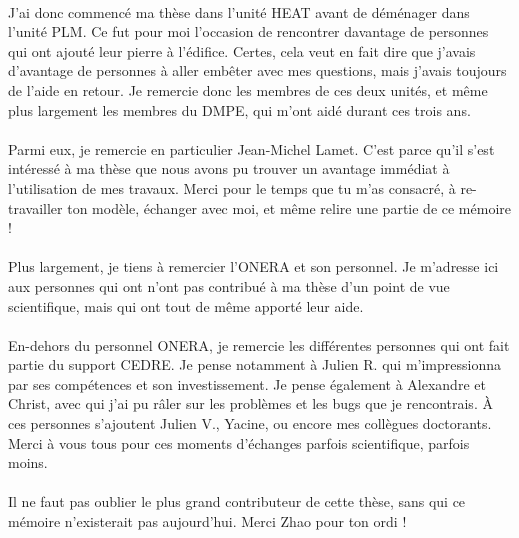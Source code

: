   \paragraph{}
  J'ai donc commencé ma thèse dans l'unité HEAT avant de déménager dans l'unité PLM.
  Ce fut pour moi l'occasion de rencontrer davantage de personnes qui ont ajouté leur pierre à l'édifice.
  Certes, cela veut en fait dire que j'avais d'avantage de personnes à aller embêter avec mes questions, mais j'avais toujours de l'aide en retour.
  Je remercie donc les membres de ces deux unités, et même plus largement les membres du DMPE, qui m'ont aidé durant ces trois ans.

  \paragraph{}
  Parmi eux, je remercie en particulier Jean-Michel Lamet.
  C'est parce qu'il s'est intéressé à ma thèse que nous avons pu trouver un avantage immédiat à l'utilisation de mes travaux.
  Merci pour le temps que tu m'as consacré, à re-travailler ton modèle, échanger avec moi, et même relire une partie de ce mémoire !

  \paragraph{}
  Plus largement, je tiens à remercier l'ONERA et son personnel.
  Je m'adresse ici aux personnes qui ont n'ont pas contribué à ma thèse d'un point de vue scientifique, mais qui ont tout de même apporté leur aide.

  \paragraph{}
  En-dehors du personnel ONERA, je remercie les différentes personnes qui ont fait partie du support CEDRE.
  Je pense notamment à Julien R. qui m'impressionna par ses compétences et son investissement.
  Je pense également à Alexandre et Christ, avec qui j'ai pu râler sur les problèmes et les bugs que je rencontrais.
  À ces personnes s'ajoutent Julien V., Yacine, ou encore mes collègues doctorants.
  Merci à vous tous pour ces moments d'échanges parfois scientifique, parfois moins.

  \paragraph{}
  Il ne faut pas oublier le plus grand contributeur de cette thèse, sans qui ce mémoire n'existerait pas aujourd'hui.
  Merci Zhao pour ton ordi !

